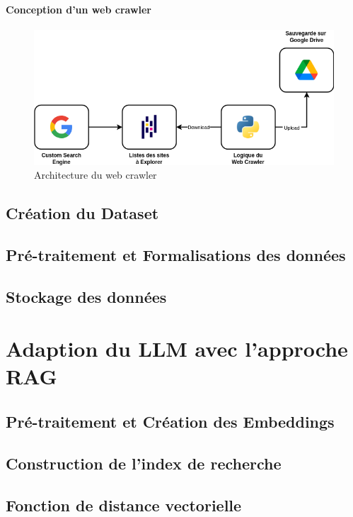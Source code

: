 \paragraph{Conception d'un web crawler} \hspace{0pt}

\begin{figure}[H]
    \centering
    \includegraphics[width=15cm]{gfx/fig-crawler-architecture.png}
    \caption{Architecture du web crawler}
    \label{fig:crawler-architecture}
\end{figure}


\newpage
\newpage
\subsection{Création du Dataset}
\subsection{Pré-traitement et Formalisations des données}
\subsection{Stockage des données}

\section{Adaption du LLM avec l'approche RAG}
\subsection{Pré-traitement et Création des Embeddings}
\subsection{Construction de l'index de recherche}
\subsection{Fonction de distance vectorielle}
